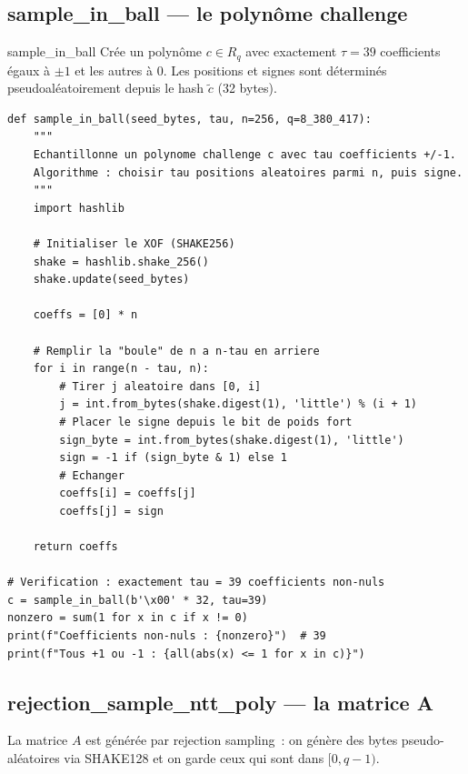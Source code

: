 \documentclass[12pt, a4paper]{article}
\newcommand{\Rq}{R_q}
\begin{document}
\subsection{sample\_in\_ball --- le polynôme challenge}

\begin{defbox}{sample\_in\_ball}
Crée un polynôme $c \in \Rq$ avec exactement $\tau = 39$ coefficients
égaux à $\pm 1$ et les autres à $0$.
Les positions et signes sont déterminés pseudoaléatoirement depuis
le hash $\tilde{c}$ (32 bytes).
\end{defbox}

\begin{lstlisting}[style=python]
def sample_in_ball(seed_bytes, tau, n=256, q=8_380_417):
    """
    Echantillonne un polynome challenge c avec tau coefficients +/-1.
    Algorithme : choisir tau positions aleatoires parmi n, puis signe.
    """
    import hashlib

    # Initialiser le XOF (SHAKE256)
    shake = hashlib.shake_256()
    shake.update(seed_bytes)

    coeffs = [0] * n

    # Remplir la "boule" de n a n-tau en arriere
    for i in range(n - tau, n):
        # Tirer j aleatoire dans [0, i]
        j = int.from_bytes(shake.digest(1), 'little') % (i + 1)
        # Placer le signe depuis le bit de poids fort
        sign_byte = int.from_bytes(shake.digest(1), 'little')
        sign = -1 if (sign_byte & 1) else 1
        # Echanger
        coeffs[i] = coeffs[j]
        coeffs[j] = sign

    return coeffs

# Verification : exactement tau = 39 coefficients non-nuls
c = sample_in_ball(b'\x00' * 32, tau=39)
nonzero = sum(1 for x in c if x != 0)
print(f"Coefficients non-nuls : {nonzero}")  # 39
print(f"Tous +1 ou -1 : {all(abs(x) <= 1 for x in c)}")
\end{lstlisting}

\subsection{rejection\_sample\_ntt\_poly --- la matrice A}

La matrice $A$ est générée par rejection sampling~: on génère des bytes
pseudo-aléatoires via SHAKE128 et on garde ceux qui sont dans $[0, q-1)$.
\end{document}
